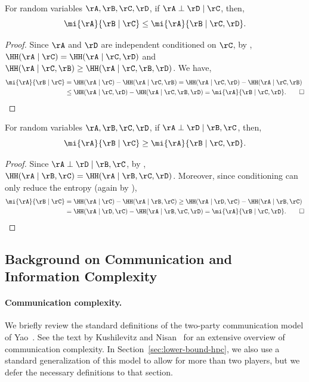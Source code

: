 \begin{proposition}\label{prop:info-increase}
  For random variables $\rA, \rB, \rC, \rD$, if $\rA \perp \rD \mid \rC$, then, 
  \[\mi{\rA}{\rB \mid \rC} \leq \mi{\rA}{\rB \mid  \rC,  \rD}.\]
\end{proposition}
 \begin{proof}
  Since $\rA$ and $\rD$ are independent conditioned on $\rC$, by
  , $\HH(\rA \mid  \rC) = \HH(\rA \mid \rC, \rD)$ and $\HH(\rA \mid  \rC, \rB) \ge \HH(\rA \mid  \rC, \rB, \rD)$.  We have,
	 \begin{align*}
	  \mi{\rA}{\rB \mid  \rC} &= \HH(\rA \mid \rC) - \HH(\rA \mid \rC, \rB) = \HH(\rA \mid  \rC, \rD) - \HH(\rA \mid \rC, \rB) \\
	  &\leq \HH(\rA \mid \rC, \rD) - \HH(\rA \mid \rC, \rB, \rD) = \mi{\rA}{\rB \mid \rC, \rD}. \qed
	\end{align*}
	
\end{proof}

\begin{proposition}\label{prop:info-decrease}
  For random variables $\rA, \rB, \rC,\rD$, if $ \rA \perp \rD \mid \rB,\rC$, then, 
  \[\mi{\rA}{\rB \mid \rC} \geq \mi{\rA}{\rB \mid \rC, \rD}.\]
\end{proposition}
 \begin{proof}
 Since $\rA \perp \rD \mid \rB,\rC$, by , $\HH(\rA \mid \rB,\rC) = \HH(\rA \mid \rB,\rC,\rD)$. Moreover, since conditioning can only reduce the entropy (again by ), 
  \begin{align*}
 	\mi{\rA}{\rB \mid  \rC} &= \HH(\rA \mid \rC) - \HH(\rA \mid \rB,\rC) \geq \HH(\rA \mid \rD,\rC) - \HH(\rA \mid \rB,\rC) \\
	&= \HH(\rA \mid \rD,\rC) - \HH(\rA \mid \rB,\rC,\rD) = \mi{\rA}{\rB \mid \rC,\rD}. \qed
 \end{align*}

\end{proof}


\subsection{Background on Communication and Information Complexity}\label{sec:cc-ic}

\paragraph{Communication complexity.} We briefly review the standard definitions of the two-party communication model of Yao~\cite{Yao79}.  See the text by Kushilevitz and Nisan~\cite{KushilevitzN97} for 
an extensive overview of communication complexity. In Section~\ref{sec:lower-bound-hpc}, we also use a standard generalization of this model to allow for more than two players, but we defer
the necessary definitions to that section. 

